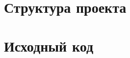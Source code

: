 \documentclass[12pt, a4paper]{article}
\begin{document}
\maketitle
\setcounter{page}{2}

\renewcommand{\contentsname}{Содержание}
\tableofcontents
\newpage

\labheading


\labreport

\section{Структура проекта}


\newpage
\section{Исходный код}



\end{document}
